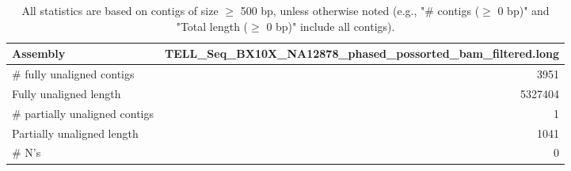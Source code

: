 \documentclass[12pt,a4paper]{article}
\begin{document}
\begin{table}[ht]
\begin{center}
\caption{All statistics are based on contigs of size $\geq$ 500 bp, unless otherwise noted (e.g., "\# contigs ($\geq$ 0 bp)" and "Total length ($\geq$ 0 bp)" include all contigs).}
\begin{tabular}{|l*{1}{|r}|}
\hline
Assembly & TELL\_Seq\_BX10X\_NA12878\_phased\_possorted\_bam\_filtered.long \\ \hline
\# fully unaligned contigs & 3951 \\ \hline
Fully unaligned length & 5327404 \\ \hline
\# partially unaligned contigs & 1 \\ \hline
Partially unaligned length & 1041 \\ \hline
\# N's & 0 \\ \hline
\end{tabular}
\end{center}
\end{table}
\end{document}
